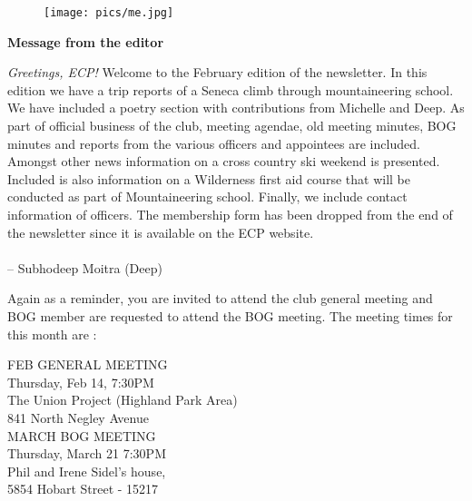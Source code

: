 \documentclass[10pt,a4paper]{article}
\newcommand{\NewsItem}[1]{%
		\usefont{T1}{augie}{m}{n} 	
		\large \bf #1 \vspace{4pt}
		\par \normalsize \normalfont}
\begin{document}
\begin{center}
\begin{minipage}[h]{0.8\linewidth}
	\begin{wrapfigure}{l}{0.41\textwidth}
		\texttt{[image: pics/me.jpg]}
		\\%
	\end{wrapfigure}
	
	\NewsItem{Message from the editor}
	\emph{Greetings, ECP!} Welcome to the February edition of the newsletter. In this edition we have a trip reports of a Seneca climb through mountaineering school. We have included a poetry section with contributions from Michelle and Deep. As part of official business of the club, meeting agendae, old meeting minutes, BOG minutes and reports from the various officers and appointees are included. Amongst other news information on a cross country ski weekend is presented. Included is also information on a Wilderness first aid course that will be conducted as part of Mountaineering school. Finally, we include contact information of officers. The membership form has been dropped from the end of the newsletter since it is available on the ECP website.
\\
\\
-- Subhodeep Moitra (Deep)

\vspace{0.5cm}

	Again as a reminder, you are invited to attend the club general meeting and BOG member are requested to attend the BOG meeting. The meeting times for this month are :
	
\vspace{1cm}

\begin{multicols}{2}
\Large
FEB GENERAL MEETING\\
Thursday, Feb 14, 7:30PM\\
The Union Project (Highland Park Area)\\
841 North Negley Avenue
\\
MARCH BOG MEETING\\
Thursday, March 21 7:30PM\\
Phil and Irene  Sidel's house,\\
5854 Hobart Street - 15217



\normalsize
\end{multicols}
	
\end{minipage}
\end{center}
\end{document}

